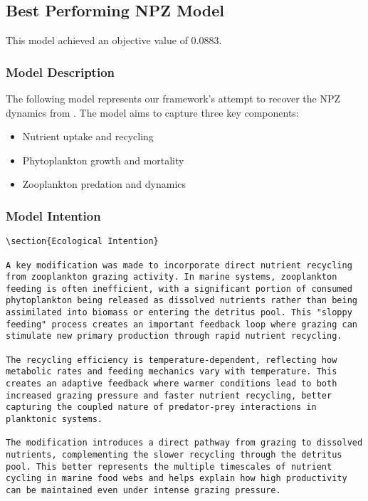 \subsection{Best Performing NPZ Model}
This model achieved an objective value of 0.0883.

\subsubsection{Model Description}
The following model represents our framework's attempt to recover the NPZ dynamics from \cite{edwards1999zooplankton}. The model aims to capture three key components:
\begin{itemize}
\item Nutrient uptake and recycling
\item Phytoplankton growth and mortality
\item Zooplankton predation and dynamics
\end{itemize}

\subsubsection{Model Intention}
\begin{lstlisting}
\section{Ecological Intention}

A key modification was made to incorporate direct nutrient recycling from zooplankton grazing activity. In marine systems, zooplankton feeding is often inefficient, with a significant portion of consumed phytoplankton being released as dissolved nutrients rather than being assimilated into biomass or entering the detritus pool. This "sloppy feeding" process creates an important feedback loop where grazing can stimulate new primary production through rapid nutrient recycling.

The recycling efficiency is temperature-dependent, reflecting how metabolic rates and feeding mechanics vary with temperature. This creates an adaptive feedback where warmer conditions lead to both increased grazing pressure and faster nutrient recycling, better capturing the coupled nature of predator-prey interactions in planktonic systems.

The modification introduces a direct pathway from grazing to dissolved nutrients, complementing the slower recycling through the detritus pool. This better represents the multiple timescales of nutrient cycling in marine food webs and helps explain how high productivity can be maintained even under intense grazing pressure.
\end{lstlisting}


